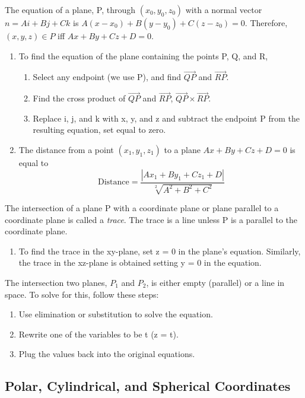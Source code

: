\documentclass[12pt, letterpaper]{article}
\begin{document}
The equation of a plane, P, through \((x_0, y_0, z_0)\) with a normal vector \(n = Ai + Bj + Ck\) is \(A(x - x_0) + B(y - y_0) + C(z - z_0) = 0\). Therefore, \((x,y,z) \in P\) iff \(Ax + By + Cz + D = 0\).
\begin{enumerate}
    \item To find the equation of the plane containing the points P, Q, and R, 
    \begin{enumerate}
        \item Select any endpoint (we use P), and find \(\overrightarrow{QP}\) and \(\overrightarrow{RP}\).
        \item Find the cross product of \(\overrightarrow{QP}\) and \(\overrightarrow{RP}\), \(\overrightarrow{QP} \times \overrightarrow{RP}\).
        \item Replace i, j, and k with x, y, and z and subtract the endpoint P from the resulting equation, set equal to zero.
    \end{enumerate}
    \item The distance from a point \((x_1, y_1, z_1)\) to a plane \(Ax + By + Cz + D = 0\) is equal to \[\text{Distance} = \frac{|Ax_1 + By_1 + Cz_1 + D|}{\sqrt[2]{A^2 + B^2 + C^2}} \]
\end{enumerate}
The intersection of a plane P with a coordinate plane or plane parallel to a coordinate plane is called a \textit{trace}. The trace is a line unless P is a parallel to the coordinate plane.
\begin{enumerate}
    \item To find the trace in the xy-plane, set z = 0 in the plane's equation. Similarly, the trace in the xz-plane is obtained setting y = 0 in the equation.
\end{enumerate}
\pagebreak The intersection two planes, \(P_1\) and \(P_2\), is either empty (parallel) or a line in space. To solve for this, follow these steps:
\begin{enumerate}
    \item Use elimination or substitution to solve the equation.
    \item Rewrite one of the variables to be t (z = t).
    \item Plug the values back into the original equations.
\end{enumerate}

\subsection{Polar, Cylindrical, and Spherical Coordinates}
\end{document}
